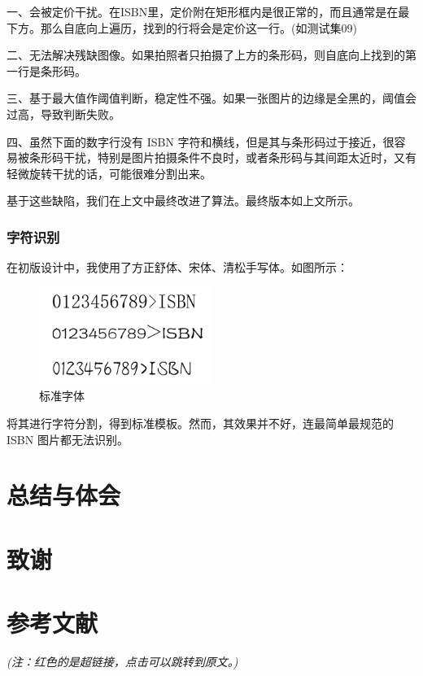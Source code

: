 \documentclass{ctexart}
\begin{document}
一、会被定价干扰。在ISBN里，定价附在矩形框内是很正常的，而且通常是在最下方。那么自底向上遍历，找到的行将会是定价这一行。(如测试集09)

二、无法解决残缺图像。如果拍照者只拍摄了上方的条形码，则自底向上找到的第一行是条形码。

三、基于最大值作阈值判断，稳定性不强。如果一张图片的边缘是全黑的，阈值会过高，导致判断失败。

四、虽然下面的数字行没有 ISBN 字符和横线，但是其与条形码过于接近，很容易被条形码干扰，特别是图片拍摄条件不良时，或者条形码与其间距太近时，又有轻微旋转干扰的话，可能很难分割出来。

基于这些缺陷，我们在上文中最终改进了算法。最终版本如上文所示。

\subsubsection{字符识别}
在初版设计中，我使用了方正舒体、宋体、清松手写体。如图所示：

\begin{figure}[H]
    \centering
    \includegraphics[height=90pt]{standard_fonts}
    \caption{标准字体}
\end{figure}

将其进行字符分割，得到标准模板。然而，其效果并不好，连最简单最规范的 ISBN 图片都无法识别。


\section{总结与体会}
\section{致谢}
\section{参考文献}


\textit{(注：红色的是超链接，点击可以跳转到原文。)}
\end{document}
